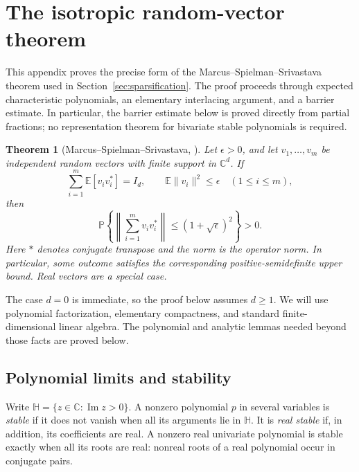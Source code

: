 \documentclass[11pt]{amsart}
\newtheorem{theorem}{Theorem}[section]
\theoremstyle{definition}
\theoremstyle{remark}
\numberwithin{equation}{section}
\begin{document}
\appendix
\section{The isotropic random-vector theorem}
\label{sec:mss}

This appendix proves the precise form of the Marcus--Spielman--Srivastava
theorem used in Section~\ref{sec:sparsification}.  The proof proceeds
through expected characteristic polynomials, an elementary interlacing
argument, and a barrier estimate.  In particular, the barrier estimate
below is proved directly from partial fractions; no representation
theorem for bivariate stable polynomials is required.

\begin{theorem}[Marcus--Spielman--Srivastava, {\cite[Theorem~1.4]{MSS}}]
\label{thm:mss}
Let $\epsilon>0$, and let $v_1,\ldots,v_m$ be independent random vectors
with finite support in $\mathbb C^d$.  If
\begin{equation}
 \sum_{i=1}^m\mathbb E[v_iv_i^*]=I_d,
 \qquad \mathbb E\|v_i\|^2\leq\epsilon\quad(1\leq i\leq m),
 \label{eq:mss-hypotheses}
\end{equation}
then
\begin{equation}
 \mathbb P\left\{
 \left\|\sum_{i=1}^m v_iv_i^*\right\|
       \leq(1+\sqrt\epsilon)^2\right\}>0.
 \label{eq:mss-conclusion}
\end{equation}
Here $*$ denotes conjugate transpose and the norm is the operator norm.
In particular, some outcome satisfies the corresponding
positive-semidefinite upper bound.  Real vectors are a special case.
\end{theorem}

The case $d=0$ is immediate, so the proof below assumes $d\geq1$.
We will use polynomial factorization, elementary compactness, and
standard finite-dimensional linear algebra.  The polynomial and
analytic lemmas needed beyond those facts are proved below.

\subsection{Polynomial limits and stability}

Write $\mathbb H=\{z\in\mathbb C:\operatorname{Im}z>0\}$.
A nonzero polynomial $p$ in several variables is \emph{stable} if it
does not vanish when all its arguments lie in $\mathbb H$.  It is
\emph{real stable} if, in addition, its coefficients are real.
A nonzero real univariate polynomial is stable exactly when all its
roots are real: nonreal roots of a real polynomial occur in conjugate
pairs.
\end{document}
